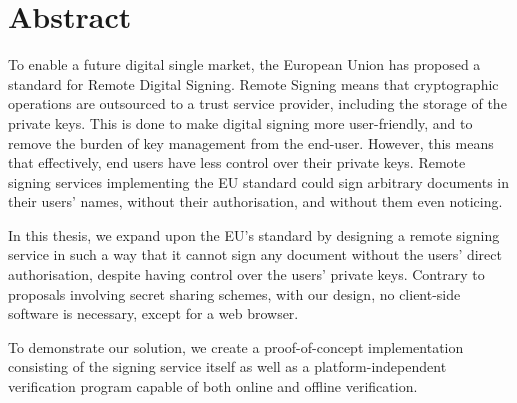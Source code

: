 \chapter*{Abstract}\label{ch:abstract}
To enable a future digital single market,
the European Union has proposed a standard for Remote Digital Signing.
Remote Signing means that cryptographic operations are outsourced to a trust service provider,
including the storage of the private keys.
This is done to make digital signing more user-friendly,
and to remove the burden of key management from the end-user.
However, this means that effectively, end users have less control over their private keys.
Remote signing services implementing the EU standard could sign arbitrary documents in their users' names,
without their authorisation, and without them even noticing.

In this thesis,
we expand upon the EU's standard by designing a remote signing service in such a way that it cannot sign any document without the users' direct authorisation,
despite having control over the users' private keys.
Contrary to proposals involving secret sharing schemes,
with our design, no client-side software is necessary, except for a web browser.

To demonstrate our solution,
we create a proof-of-concept implementation consisting of the signing service itself as well as a
 platform-independent verification program capable of both online and offline verification.




